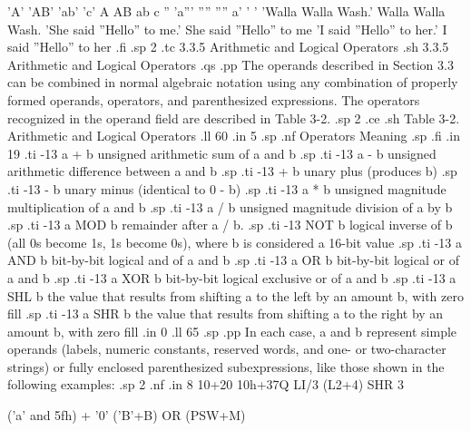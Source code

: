      'A' 'AB' 'ab' 'c'               A  AB  ab  c
     '' 'a''' '''' ''''                 a'  '   '
     'Walla Walla Wash.'             Walla Walla Wash.
     'She said ''Hello'' to me.'     She said ''Hello'' to me
     'I said ''Hello'' to her.'      I said ''Hello'' to her
.fi
.sp 2
.tc         3.3.5  Arithmetic and Logical Operators
.sh
3.3.5  Arithmetic and Logical Operators
.qs
.pp
The operands described in Section 3.3 can be combined in normal algebraic 
notation using any combination of properly formed operands, 
operators, and parenthesized expressions.  The operators 
recognized in the operand field are described in Table 3-2.
.sp 2
.ce
.sh
Table 3-2.  Arithmetic and Logical Operators
.ll 60
.in 5
.sp
.nf
Operators                         Meaning
.sp
.fi
.in 19
.ti -13
a + b        unsigned arithmetic sum of a and b
.sp
.ti -13
a - b        unsigned arithmetic difference between a and b
.sp
.ti -13
  + b        unary plus (produces b)
.sp
.ti -13
  - b        unary minus (identical to 0 - b)
.sp
.ti -13
a * b        unsigned magnitude multiplication of a and b
.sp
.ti -13
a / b        unsigned magnitude division of a by b
.sp
.ti -13
a MOD b      remainder after a / b.
.sp
.ti -13
NOT b        logical inverse of b (all 0s become 1s, 1s become 
0s), where b is considered a 16-bit value
.sp
.ti -13
a AND b      bit-by-bit logical and of a and b
.sp
.ti -13
a OR b       bit-by-bit logical or of a and b
.sp
.ti -13
a XOR b      bit-by-bit logical exclusive or of a and b
.sp
.ti -13
a SHL b      the value that results from shifting a to the left 
by an amount b, with zero fill
.sp
.ti -13
a SHR b      the value that results from shifting a to the 
right by an amount b, with zero fill
.in 0
.ll 65
.sp
.pp
In each case, a and b represent simple operands (labels, numeric 
constants, reserved words, and one- or two-character strings) or 
fully enclosed parenthesized subexpressions, like those shown in 
the following examples:
.sp 2
.nf
.in 8
10+20  10h+37Q  LI/3  (L2+4) SHR 3

('a' and 5fh) + '0' ('B'+B) OR (PSW+M)

